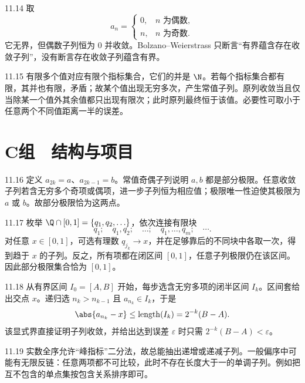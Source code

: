 \begin{solution}{11.14}
取
\[
 a_n=\begin{cases}0,&n\text{ 为偶数},\\ n,&n\text{ 为奇数}.\end{cases}
\]
它无界，但偶数子列恒为 \(0\) 并收敛。Bolzano--Weierstrass 只断言“有界蕴含存在收敛子列”，没有断言存在收敛子列蕴含有界。
\end{solution}

\begin{solution}{11.15}
有限多个值对应有限个指标集合，它们的并是 \(\N\)。若每个指标集合都有限，其并也有限，矛盾；故某个值出现无穷多次，产生常值子列。原列收敛当且仅当除某一个值外其余值都只出现有限次；此时原列最终恒于该值。必要性可取小于任意两个不同值距离一半的误差。
\end{solution}

\section*{C组　结构与项目}

\begin{solution}{11.16}
定义 \(a_{2k}=a\)、\(a_{2k-1}=b\)。常值奇偶子列说明 \(a,b\) 都是部分极限。任意收敛子列若含无穷多个奇项或偶项，进一步子列恒为相应值；极限唯一性迫使其极限为 \(a\) 或 \(b\)。故部分极限恰为这两点。
\end{solution}

\begin{solution}{11.17}
枚举 \(\Q\cap[0,1]=\{q_1,q_2,\ldots\}\)，依次连接有限块
\[
 q_1;\quad q_1,q_2;\quad\ldots;\quad q_1,\ldots,q_m;\quad\cdots.
\]
对任意 \(x\in[0,1]\)，可选有理数 \(q_{j_k}\to x\)，并在足够靠后的不同块中各取一次，得到趋于 \(x\) 的子列。反之，所有项都在闭区间 \([0,1]\)，任意子列极限仍在该区间。因此部分极限集合恰为 \([0,1]\)。
\end{solution}

\begin{solution}{11.18}
从有界区间 \(I_0=[A,B]\) 开始，每步选含无穷多项的闭半区间 \(I_k\)。区间套给出交点 \(x\)。递归选 \(n_k>n_{k-1}\) 且 \(a_{n_k}\in I_k\)，于是
\[
 \abs{a_{n_k}-x}\le\operatorname{length}(I_k)
 =2^{-k}(B-A).
\]
该显式界直接证明子列收敛，并给出达到误差 \(\varepsilon\) 时只需
\(2^{-k}(B-A)<\varepsilon\)。
\end{solution}

\begin{solution}{11.19}
实数全序允许“峰指标”二分法，故总能抽出递增或递减子列。一般偏序中可能有无限反链：任意两项都不可比较，此时不存在长度大于一的单调子列。例如把互不包含的单点集按包含关系排序即可。
\end{solution}

